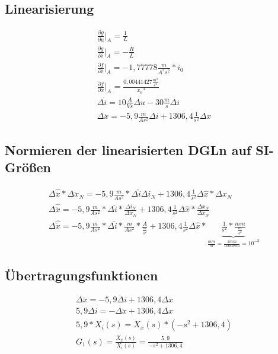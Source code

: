 \documentclass[10pt,a4paper]{article}
\begin{document}
\subsection{Linearisierung}
\begin{figure}[H]
  \begin{align}
	  \frac{\partial g}{\partial u} \Big|_A = \frac{1}{L} \nonumber \\
	  \frac{\partial g}{\partial i} \Big|_A = -\frac{R}{L} \nonumber \\
	  \frac{\partial f}{\partial i} \Big|_A = -1,77778\frac{m}{A^2s^2} * i_0 \nonumber \\
	  \frac{\partial f}{\partial x} \Big|_A = \frac{0,00441427\frac{m^2}{s^2}}{{x_0}^3} \nonumber \\
	  \Delta \dot{i} = 10\frac{A}{Vs}\Delta u - 30 \frac{m}{s} \Delta i \nonumber \\
	  \Delta \ddot{x} = -5,9\frac{m}{As^2} \Delta i + 1306,4 \frac{1}{s^2} \Delta x \nonumber
  \end{align}
\end{figure}


\subsection{Normieren der linearisierten DGLn auf SI-Größen}
\begin{figure}[H]
  \begin{align}
	\Delta \hat{\ddot{x}} * \Delta \ddot{x}_N = -5,9\frac{m}{As^2} * \Delta \hat{i} \Delta i_N + 1306,4 \frac{1}{s^2} \Delta \hat{x} * \Delta x_N \nonumber \\
	\Delta \hat{\ddot{x}} = -5,9\frac{m}{As^2} * \Delta \hat{i} * \frac{\Delta i_N}{\Delta \ddot{x}_N} + 1306,4 \frac{1}{s^2} \Delta \hat{x} * \frac{\Delta x_N}{\Delta \ddot{x}_N} \nonumber \\
	\Delta \hat{\ddot{x}} = -5,9\frac{m}{As^2} * \Delta \hat{i} * \frac{m}{As^2} * \frac{A}{\frac{m}{s^2}} + 1306,4 \frac{1}{s^2} \Delta \hat{x} * \underbrace{\frac{1}{s^2} * \frac{mm}{\frac{m}{s^2}}}_\text{$\frac{mm}{m} = \frac{1mm}{1000mm} = 10^{-3}$} \nonumber
  \end{align}
\end{figure}


\subsection{Übertragungsfunktionen}
\begin{figure}[H]
  \begin{align}
	  \Delta\ddot{x} = -5,9\Delta i + 1306,4 \Delta x \nonumber \\
	  5,9 \Delta i = -\Delta \ddot{x} + 1306,4 \Delta x \nonumber \\
	  5,9 * X_i(s) = X_x(s) * (-s^2 + 1306,4) \nonumber \\ 
	  G_1(s) = \frac{X_x(s)}{X_i(s)} = \frac{5,9}{-s^2 + 1306,4} \nonumber
  \end{align}
\end{figure}
\end{document}
